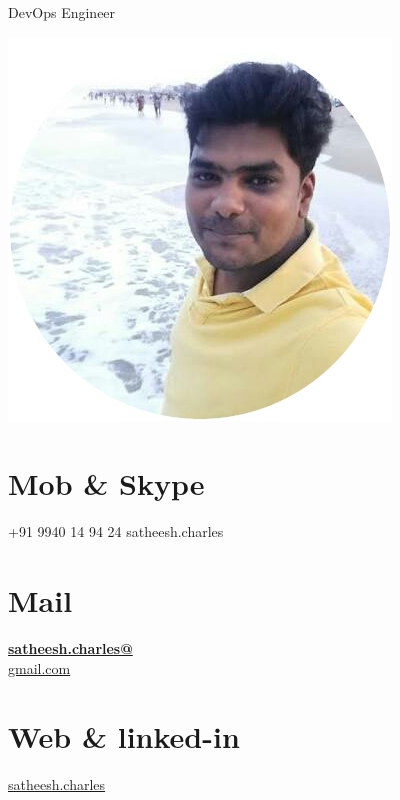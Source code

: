 \documentclass[]{friggeri-cv}
\begin{document}
      {DevOps Engineer}
      

\begin{aside}
  \includegraphics[scale=0.30]{img/Satt.jpg}
  \section{Mob \& Skype}
    +91 9940 14 94 24
    satheesh.charles
    ~
  \section{Mail}
    \href{mailto:satheesh.charles@gmail.com}{\textbf{satheesh.charles@}\\gmail.com}
    ~
  \section{Web \& linked-in}
    \href{https://www.linkedin.com/in/satheesh-charles-a1977928/}{satheesh.charles}
    ~
    ~
    ~

\end{aside}
\end{document}
